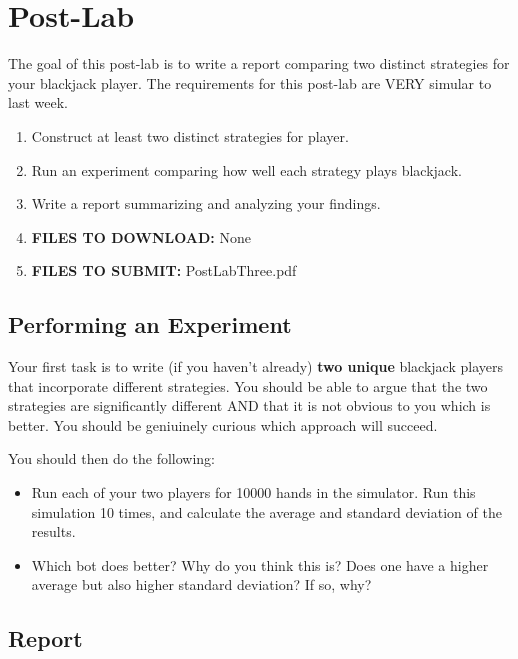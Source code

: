 \documentclass[paper=a4, fontsize=11pt, parskip=full]{scrartcl} %
\numberwithin{equation}{section} %
\numberwithin{figure}{section} %
\numberwithin{table}{section} %
\begin{document}


\newpage
\section{Post-Lab}

The goal of this post-lab is to write a report comparing two distinct strategies for your blackjack player. The requirements for this post-lab are VERY simular to last week.

\begin{enumerate}
	\item Construct at least two distinct strategies for player.
	\item Run an experiment comparing how well each strategy plays blackjack.
	\item Write a report summarizing and analyzing your findings.
	\item \textbf{FILES TO DOWNLOAD:} None
	\item \textbf{FILES TO SUBMIT:} PostLabThree.pdf
\end{enumerate}

\subsection{Performing an Experiment}

Your first task is to write (if you haven't already) \textbf{two unique} blackjack players that incorporate different strategies. You should be able to argue that the two strategies are significantly different AND that it is not obvious to you which is better. You should be geniuinely curious which approach will succeed.

You should then do the following:

\begin{itemize}
	\item Run each of your two players for 10000 hands in the simulator. Run this simulation 10 times, and calculate the average and standard deviation of the results.
	\item Which bot does better? Why do you think this is? Does one have a higher average but also higher standard deviation? If so, why?
\end{itemize}

\subsection{Report}
\end{document}
